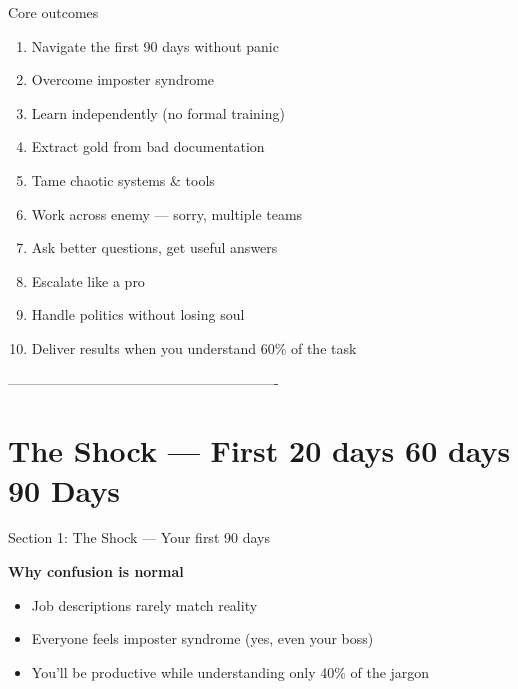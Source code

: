 \documentclass[aspectratio=169, 11pt]{beamer}
\begin{document}
	\begin{frame}{Core outcomes}
		\begin{enumerate}
			\item Navigate the first 90 days without panic
			\item Overcome imposter syndrome
			\item Learn independently (no formal training)
			\item Extract gold from bad documentation
			\item Tame chaotic systems \& tools
			\item Work across enemy — sorry, multiple teams
			\item Ask better questions, get useful answers
			\item Escalate like a pro
			\item Handle politics without losing soul
			\item Deliver results when you understand 60\% of the task
		\end{enumerate}
	\end{frame}
	
	
	
	 ----------------------------------------------------------
	\section{The Shock — First 20 days 60 days 90 Days}
	\begin{frame}{Section 1: The Shock — Your first 90 days}
		\begin{center}
			\Large{\textbf{Why confusion is normal}}
		\end{center}
		\vspace{0.3cm}
		\begin{itemize}
			\item Job descriptions rarely match reality
			\item Everyone feels imposter syndrome (yes, even your boss)
			\item You'll be productive while understanding only 40\% of the jargon
		\end{itemize}
	\end{frame}
	
\end{document}
